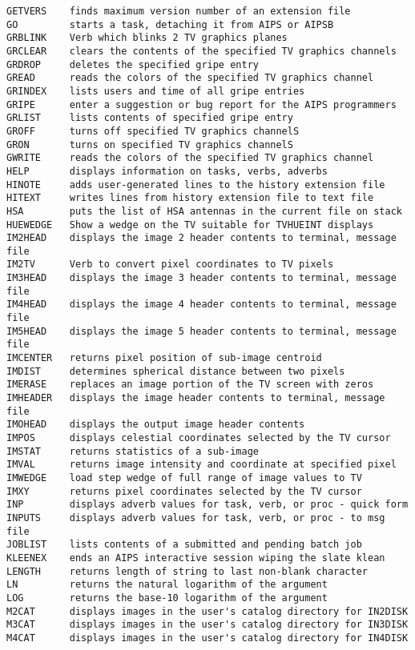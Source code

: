\begin{verbatim}
GETVERS    finds maximum version number of an extension file
GO         starts a task, detaching it from AIPS or AIPSB
GRBLINK    Verb which blinks 2 TV graphics planes
GRCLEAR    clears the contents of the specified TV graphics channels
GRDROP     deletes the specified gripe entry
GREAD      reads the colors of the specified TV graphics channel
GRINDEX    lists users and time of all gripe entries
GRIPE      enter a suggestion or bug report for the AIPS programmers
GRLIST     lists contents of specified gripe entry
GROFF      turns off specified TV graphics channelS
GRON       turns on specified TV graphics channelS
GWRITE     reads the colors of the specified TV graphics channel
HELP       displays information on tasks, verbs, adverbs
HINOTE     adds user-generated lines to the history extension file
HITEXT     writes lines from history extension file to text file
HSA        puts the list of HSA antennas in the current file on stack
HUEWEDGE   Show a wedge on the TV suitable for TVHUEINT displays
IM2HEAD    displays the image 2 header contents to terminal, message file
IM2TV      Verb to convert pixel coordinates to TV pixels
IM3HEAD    displays the image 3 header contents to terminal, message file
IM4HEAD    displays the image 4 header contents to terminal, message file
IM5HEAD    displays the image 5 header contents to terminal, message file
IMCENTER   returns pixel position of sub-image centroid
IMDIST     determines spherical distance between two pixels
IMERASE    replaces an image portion of the TV screen with zeros
IMHEADER   displays the image header contents to terminal, message file
IMOHEAD    displays the output image header contents
IMPOS      displays celestial coordinates selected by the TV cursor
IMSTAT     returns statistics of a sub-image
IMVAL      returns image intensity and coordinate at specified pixel
IMWEDGE    load step wedge of full range of image values to TV
IMXY       returns pixel coordinates selected by the TV cursor
INP        displays adverb values for task, verb, or proc - quick form
INPUTS     displays adverb values for task, verb, or proc - to msg file
JOBLIST    lists contents of a submitted and pending batch job
KLEENEX    ends an AIPS interactive session wiping the slate klean
LENGTH     returns length of string to last non-blank character
LN         returns the natural logarithm of the argument
LOG        returns the base-10 logarithm of the argument
M2CAT      displays images in the user's catalog directory for IN2DISK
M3CAT      displays images in the user's catalog directory for IN3DISK
M4CAT      displays images in the user's catalog directory for IN4DISK

\end{verbatim}
